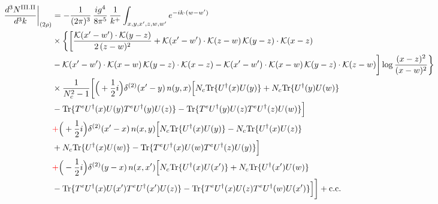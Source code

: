 \documentclass[9pt]{article}
\numberwithin{equation}{section}
\begin{document}
\begin{align}
\frac{d^{3}N^{\rm III.II}}{d^{3}k}\bigg|_{(2\rho)}&=-\frac{1}{(2\pi)^{3}}\,\frac{ig^{4}}{8\pi^{5}}\,\frac{1}{k^{+}}\int_{x,y,x',z,w,w'}e^{-ik\cdot(w-w')}\notag\\
&\times\bigg\{\bigg[\frac{\mathcal{K}(x'-w')\cdot\mathcal{K}(y-z)}{2\,(z-w)^{2}}+\mathcal{K}(x'-w')\cdot\mathcal{K}(z-w)\,\mathcal{K}(y-z)\cdot\mathcal{K}(x-z)\notag\\
&-\mathcal{K}(x'-w')\cdot\mathcal{K}(x-w)\,\mathcal{K}(y-z)\cdot\mathcal{K}(x-z)-\mathcal{K}(x'-w')\cdot\mathcal{K}(x-w)\,\mathcal{K}(y-z)\cdot\mathcal{K}(z-w)\bigg]\log\frac{(x-z)^{2}}{(x-w)^{2}}\bigg\}\notag\\
&\times \frac{1}{N_{c}^{2}-1}\bigg[\Big(+\frac{1}{2}i\Big)\delta^{(2)}(x'-y)\,n(y,x)\Big[N_{c}{\rm Tr}\{U^{\dagger}(x)U(y)\}+N_{c}{\rm Tr}\{U^{\dagger}(y)U(w)\}\notag\\
& -{\rm Tr}\{T^{e}U^{\dagger}(x)U(y)T^{e}U^{\dagger}(y)U(z)\}-{\rm Tr}\{T^{e}U^{\dagger}(y)U(z)T^{e}U^{\dagger}(z)U(w)\}\Big]\notag\\
& {\color{red}+}\Big(+\frac{1}{2}i\Big)\delta^{(2)}(x'-x)\,n(x,y)\Big[N_{c}{\rm Tr}\{U^{\dagger}(x)U(y)\}-N_{c}{\rm Tr}\{U^{\dagger}(x)U(z)\}\notag\\
& +N_{c}{\rm Tr}\{U^{\dagger}(x)U(w)\}-{\rm Tr}\{T^{e}U^{\dagger}(x)U(w)T^{e}U^{\dagger}(z)U(y)\}\Big]\notag\\
& {\color{red}+}\Big(-\frac{1}{2}i\Big)\delta^{(2)}(y-x)\,n(x,x')\Big[N_{c}{\rm Tr}\{U^{\dagger}(x)U(x')\}+N_{c}{\rm Tr}\{U^{\dagger}(x')U(w)\}\notag\\
& -{\rm Tr}\{T^{e}U^{\dagger}(x)U(x')T^{e}U^{\dagger}(x')U(z)\}-{\rm Tr}\{T^{e}U^{\dagger}(x)U(z)T^{e}U^{\dagger}(w)U(x')\}\Big]\bigg]+{\rm c.c.}\label{eq:E-III.II-2}
\end{align}
\end{document}
